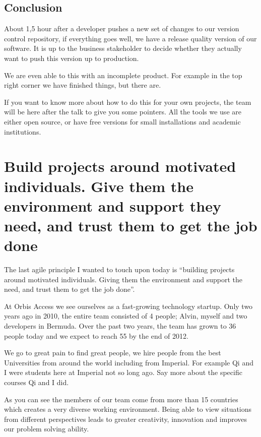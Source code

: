 \documentclass{article}
\begin{document}
\subsection{Conclusion}
About 1,5 hour after a developer pushes a new set of changes to our
version control repository, if everything goes well, we have a release
quality version of our software.
%
It is up to the business stakeholder to decide whether they actually
want to push this version up to production.

We are even able to this with an incomplete product.
%
For example in the top right corner we have finished things, but there
are.


If you want to know more about how to do this for your own projects,
the team will be here after the talk to give you some pointers.
%
All the tools we use are either open source, or have free versions for
small installations and academic institutions.


\section{Build projects around motivated individuals. Give them the environment and support they need, and trust them to get the job done}

The last agile principle I wanted to touch upon today is ``building
projects around motivated individuals. Giving them the environment and
support the need, and trust them to get the job done''.

At Orbis Access we see ourselves as a fast-growing technology startup.
%
Only two years ago in 2010, the entire team consisted of 4 people;
Alvin, myself and two developers in Bermuda.
%
Over the past two years, the team has grown to 36 people today and we
expect to reach 55 by the end of 2012.

We go to great pain to find great people, we hire people from the best
Universities from around the world including from Imperial.
%
For example Qi and I were students here at Imperial not so long ago.
%
Say more about the specific courses Qi and I did.

As you can see the members of our team come from more than 15
countries which creates a very diverse working environment.
%
Being able to view situations from different perspectives leads to
greater creativity, innovation and improves our problem solving
ability.
\end{document}
